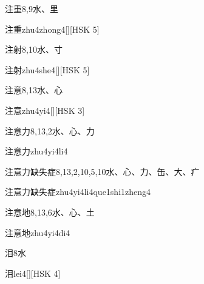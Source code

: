 \begin{entry}{注重}{8,9}{⽔、⾥}
  \begin{phonetics}{注重}{zhu4zhong4}[][HSK 5]
  \end{phonetics}
\end{entry}

\begin{entry}{注射}{8,10}{⽔、⼨}
  \begin{phonetics}{注射}{zhu4she4}[][HSK 5]
  \end{phonetics}
\end{entry}

\begin{entry}{注意}{8,13}{⽔、⼼}
  \begin{phonetics}{注意}{zhu4yi4}[][HSK 3]
  \end{phonetics}
\end{entry}

\begin{entry}{注意力}{8,13,2}{⽔、⼼、⼒}
  \begin{phonetics}{注意力}{zhu4yi4li4}
  \end{phonetics}
\end{entry}

\begin{entry}{注意力缺失症}{8,13,2,10,5,10}{⽔、⼼、⼒、⽸、⼤、⽧}
  \begin{phonetics}{注意力缺失症}{zhu4yi4li4que1shi1zheng4}
  \end{phonetics}
\end{entry}

\begin{entry}{注意地}{8,13,6}{⽔、⼼、⼟}
  \begin{phonetics}{注意地}{zhu4yi4di4}
  \end{phonetics}
\end{entry}

\begin{entry}{泪}{8}{⽔}
  \begin{phonetics}{泪}{lei4}[][HSK 4]
  \end{phonetics}
\end{entry}

